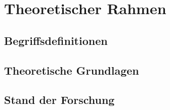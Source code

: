 \chapter{Theoretischer Rahmen}\label{chap:theorie}

\section{Begriffsdefinitionen}\label{sec:begriffe}

\section{Theoretische Grundlagen}\label{sec:grundlagen}

\section{Stand der Forschung}\label{sec:stand}
